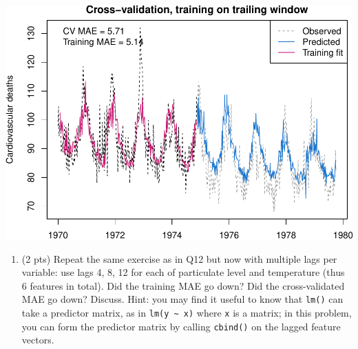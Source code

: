 \documentclass[
]{article}
\providecommand{\tightlist}{%
  \setlength{\itemsep}{0pt}\setlength{\parskip}{0pt}}
\begin{document}
\includegraphics{homework2_files/figure-latex/unnamed-chunk-2-1.pdf}

\begin{enumerate}
\def\labelenumi{\arabic{enumi}.}
\setcounter{enumi}{12}
\tightlist
\item
  (2 pts) Repeat the same exercise as in Q12 but now with multiple lags
  per variable: use lags 4, 8, 12 for each of particulate level and
  temperature (thus 6 features in total). Did the training MAE go down?
  Did the cross-validated MAE go down? Discuss. Hint: you may find it
  useful to know that \texttt{lm()} can take a predictor matrix, as in
  \texttt{lm(y\ \textasciitilde{}\ x)} where \texttt{x} is a matrix; in
  this problem, you can form the predictor matrix by calling
  \texttt{cbind()} on the lagged feature vectors.
\end{enumerate}
\end{document}
